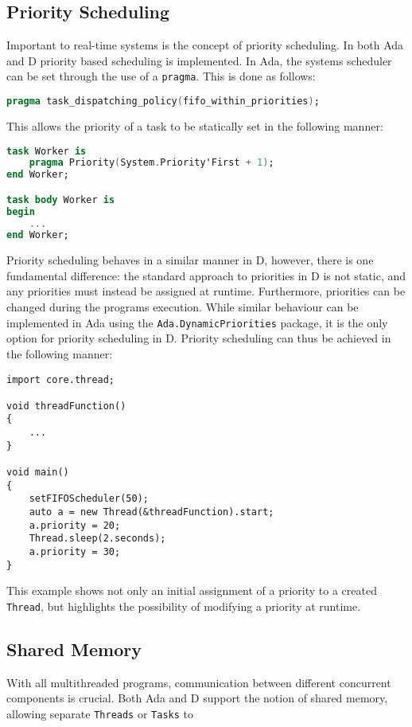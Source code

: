 \subsection{Priority Scheduling}
Important to real-time systems is the concept of priority scheduling. In both
Ada and D priority based scheduling is implemented. In Ada, the systems scheduler can
be set through the use of a \texttt{pragma}. This is done as follows: 
\begin{lstlisting}[language=Ada]
pragma task_dispatching_policy(fifo_within_priorities); 
\end{lstlisting}
This allows the priority of a task to be statically set in the following manner: 
\begin{lstlisting}[language=Ada]
task Worker is 
    pragma Priority(System.Priority'First + 1); 
end Worker;

task body Worker is 
begin 
    ...
end Worker; 
\end{lstlisting}
Priority scheduling behaves in a similar manner in D, however, there is one
fundamental difference: the standard approach to priorities in D is not static, 
and any priorities must instead be assigned at runtime. 
Furthermore, priorities can be changed during the programs execution. While similar
behaviour can be implemented in Ada using the
\texttt{Ada.Dynamic\textunderscore{}Priorities}
package, it is the only option for priority scheduling in D. 
Priority scheduling can thus be achieved in the following manner: 
\begin{lstlisting}
import core.thread; 

void threadFunction()
{
    ...
}

void main()
{
    setFIFOScheduler(50);
    auto a = new Thread(&threadFunction).start;
    a.priority = 20; 
    Thread.sleep(2.seconds); 
    a.priority = 30; 
}
\end{lstlisting}
This example shows not only an initial assignment of a priority to a created
\texttt{Thread}, but highlights the possibility of modifying a priority at
runtime. 

\subsection{Shared Memory}
With all multithreaded programs, communication between different concurrent
components is crucial. Both Ada and D support the notion of shared memory,
allowing separate \texttt{Threads} or \texttt{Tasks} to 


